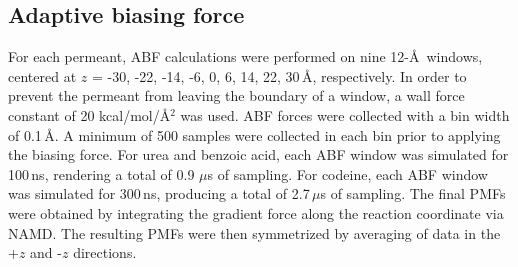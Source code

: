   \subsection*{Adaptive biasing force}
    \par %
    For each permeant, ABF calculations were performed on nine 12-\AA~windows, centered at $z$ = -30, -22, -14, -6, 0, 6, 14, 22, 30\,\AA, respectively. In order to prevent the permeant from leaving the boundary of a window, a wall force constant of 20 kcal/mol/\AA$^2$ was used. ABF forces were collected with a bin width of  0.1\,\AA. A minimum of 500 samples were collected in each bin prior to applying the biasing force. For urea and benzoic acid, each ABF window was simulated for 100\,ns, rendering a total of 0.9 $\mu$s of sampling. For codeine, each ABF window was simulated for 300\,ns, producing a total of 2.7\,$\mu$s of sampling. The final PMFs were obtained by integrating the gradient force along the reaction coordinate via NAMD. The resulting PMFs were then symmetrized by averaging of data in the +$z$ and -$z$ directions.

